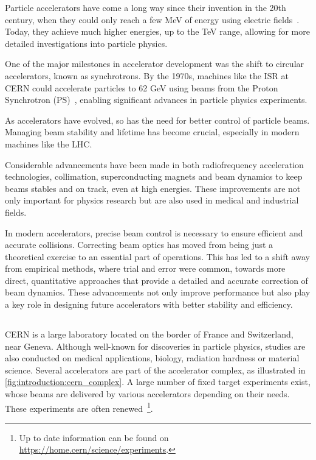 Particle accelerators have come a long way since their invention in the 20th century, when they
could only reach a few MeV of energy using electric fields~\cite{bryant_brief_1994}. Today, they
achieve much higher energies, up to the TeV range, allowing for more detailed investigations into
particle physics.

One of the major milestones in accelerator development was the shift to circular accelerators, known
as synchrotrons. By the 1970s, machines like the ISR at CERN could accelerate particles to 62 GeV
using beams from the Proton Synchrotron (PS)~\cite{philip_cerns_2011}, enabling significant advances
in particle physics experiments.

As accelerators have evolved, so has the need for better control of particle beams. Managing beam
stability and lifetime has become crucial, especially in modern machines like the LHC. 

Considerable advancements have been made in both radiofrequency acceleration technologies,
collimation, superconducting magnets and beam dynamics to keep beams stables and on track, even at
high energies. These improvements are not only important for physics research but are also used in
medical and industrial fields.

In modern accelerators, precise beam control is necessary to ensure efficient and accurate
collisions. Correcting beam optics has moved from being just a theoretical exercise to an essential
part of operations. This has led to a shift away from empirical methods, where trial and error were
common, towards more direct, quantitative approaches that provide a detailed and accurate correction
of beam dynamics. These advancements not only improve performance but also play a key role in
designing future accelerators with better stability and efficiency.


\subsection{}

CERN is a large laboratory located on the border of France and Switzerland, near Geneva. Although
well-known for discoveries in particle physics, studies are also conducted on medical applications,
biology, radiation hardness or material science.
Several accelerators are part of the accelerator complex, as illustrated in
\cref{fig:introduction:cern_complex}. A large number of fixed target experiments exist, whose
beams are delivered by various accelerators depending on their needs. These experiments are often
renewed~\footnote{Up to date information can be found on
\href{https://home.cern/science/experiments}{https://home.cern/science/experiments}.}.

